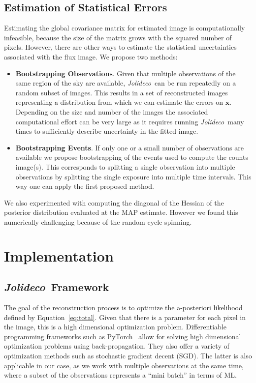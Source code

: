 \documentclass[twocolumn, linenumbers]{aastex631}
\newcommand{\jolideco}{\textit{Jolideco}~}
\begin{document}
    \subsection{Estimation of Statistical Errors}
    Estimating the global covariance matrix for estimated image is computationally infeasible, because the size of the matrix grows with the squared number of pixels. However, there are other ways to estimate the statistical uncertainties associated with the flux image. We propose two methods:

    \begin{itemize}
    \item \textbf{Bootstrapping Observations}. Given that multiple observations of the same region of the sky are available, \jolideco can be run repeatedly on a random subset of images. This results in a set of reconstructed images representing a distribution from which we can estimate the errors on $\mathbf{x}$. Depending on the size and number of the images the associated computational effort can be very large as it requires running \jolideco many times to sufficiently describe uncertainty in the fitted image.

    \item \textbf{Bootstrapping Events}. If only one or a small number of observations are available we propose bootstrapping of the events used to compute the counts image(s). This corresponds to splitting a single observation into multiple observations by splitting the single exposure into multiple time intervals. This way one can apply the first proposed method.
    \end{itemize}

    We also experimented with computing the diagonal of the Hessian of the posterior distribution evaluated at the MAP estimate. However we found this numerically challenging because of the random cycle spinning. 

    \section{Implementation}
    \subsection{\jolideco Framework}
    The goal of the reconstruction process is to optimize the a-posteriori likelihood defined by Equation~\ref{eq:total}. Given that there is a parameter for each pixel in the image, this is a high dimensional optimization problem. Differentiable programming frameworks such as PyTorch~\citep{Pytorch2019} allow for solving high dimensional optimization problems using back-propagation. They also offer a variety of optimization methods such as stochastic gradient decent (SGD). The latter is also applicable in our case, as we work with multiple observations at the same time, where a subset of the observations represents a \enquote{mini batch} in terms of ML.
\end{document}
